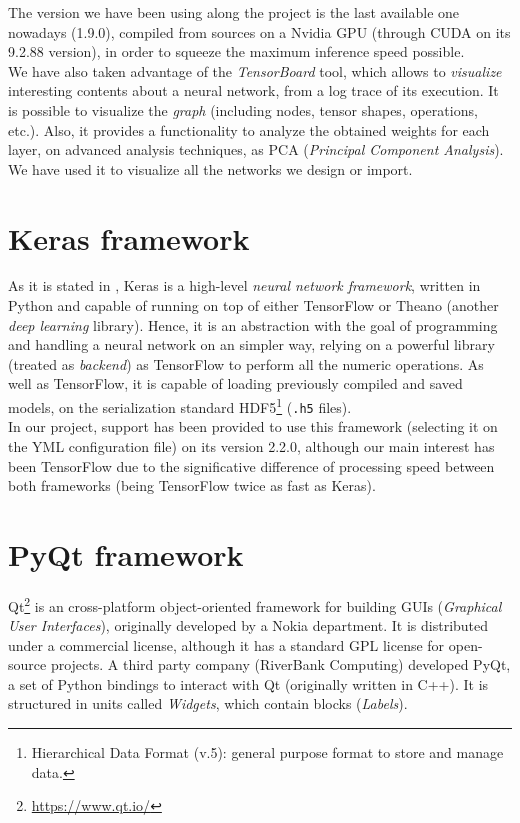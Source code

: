 	The version we have been using along the project is the last available one nowadays (1.9.0), compiled from sources on a Nvidia GPU (through CUDA on its 9.2.88 version), in order to squeeze the maximum inference speed possible.\\
	
	We have also taken advantage of the \emph{TensorBoard} tool, which allows to \emph{visualize} interesting contents about a neural network, from a log trace of its execution. It is possible to visualize the \emph{graph} (including nodes, tensor shapes, operations, etc.). Also, it provides a functionality to analyze the obtained weights for each layer, on advanced analysis techniques, as PCA (\emph{Principal Component Analysis}). We have used it to visualize all the networks we design or import.




\section{Keras framework}
	As it is stated in \cite{dpascualhe}, Keras is a high-level \emph{neural network framework}, written in Python and capable of running on top of either TensorFlow or Theano (another \emph{deep learning} library). Hence, it is an abstraction with the goal of programming and handling a neural network on an simpler way, relying on a powerful library (treated as \emph{backend}) as TensorFlow to perform all the numeric operations. As well as TensorFlow, it is capable of loading previously compiled and saved models, on the serialization standard HDF5\footnote{Hierarchical Data Format (v.5): general purpose format to store and manage data.} (\texttt{.h5} files).\\
	
	In our project, support has been provided to use this framework (selecting it on the YML configuration file) on its version 2.2.0, although our main interest has been TensorFlow due to the significative difference of processing speed between both frameworks (being TensorFlow twice as fast as Keras).
\section{PyQt framework}
	Qt\footnote{\url{https://www.qt.io/}} is an cross-platform object-oriented framework for building GUIs (\emph{Graphical User Interfaces}), originally developed by a Nokia department. It is distributed under a commercial license, although it has a standard GPL license for open-source projects. A third party company (RiverBank Computing) developed PyQt, a set of Python bindings to interact with Qt (originally written in C++). It is structured in units called \emph{Widgets}, which contain blocks (\emph{Labels}).\\
	
